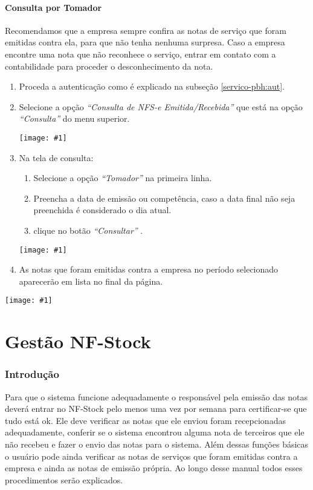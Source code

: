 \documentclass{article}
\newcommand{\itasp}[1]{
  \textit{``#1''}
}
\newcommand{\imagem}[2]{
  \begin{center}
    \texttt{[image: \#1]}
  \end{center}
}
\newcommand{\parte}[1]{
  \pagebreak
  \partfont{\centering}
  \imagem{logo}{0.4}
  \vspace*{\fill}
    \part{#1}
  \vspace*{\fill}
  \pagebreak
}
\begin{document}
\subsection{Consulta por Tomador}
\label{servico-pbh:tomador}
Recomendamos que a empresa sempre confira as notas de serviço que foram emitidas contra ela, para que não tenha nenhuma surpresa. Caso a empresa encontre uma nota que não reconhece o serviço, entrar em contato com a contabilidade para proceder o desconhecimento da nota.
  \begin{enumerate}
    \item Proceda a autenticação como é explicado na subseção \ref{servico-pbh:aut}.
    \item Selecione a opção \itasp{Consulta de NFS-e Emitida/Recebida} que está na opção \itasp{Consulta} do menu superior. \imagem{consulta-nota-menu}{0.5}
    \item Na tela de consulta:
    \begin{enumerate}[label*=\arabic*.]
      \item Selecione a opção \itasp{Tomador} na primeira linha.
      \item Preencha a data de emissão ou competência, caso a data final não seja preenchida é considerado o dia atual.
      \item clique no botão \itasp{Consultar}.
    \end{enumerate}
    \imagem{consulta-nfse}{0.7}
    \item As notas que foram emitidas contra a empresa no período selecionado aparecerão em lista no final da página.
  \end{enumerate}

  \parte{Gestão NF-Stock}
  \section{Introdução}
  \label{sec:intro-nfstock}
  
  Para que o sistema funcione adequadamente o responsável pela emissão das notas deverá entrar no NF-Stock pelo menos uma vez por semana para certificar-se que tudo está ok. Ele deve verificar as notas que ele enviou foram recepcionadas adequadamente, conferir se o sistema encontrou alguma nota de terceiros que ele não recebeu e fazer o envio das notas para o sistema. Além dessas funções básicas o usuário pode ainda verificar as notas de serviços que foram emitidas contra a empresa e ainda as notas de emissão própria. Ao longo desse manual todos esses procedimentos serão explicados.
  
\end{document}
